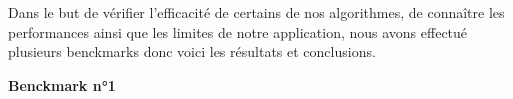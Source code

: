 Dans le but de vérifier l'efficacité de certains de nos algorithmes, de connaître les performances ainsi que les limites de notre application, nous avons effectué plusieurs benckmarks donc voici les résultats et conclusions.

\textbf{Benckmark n°1}

